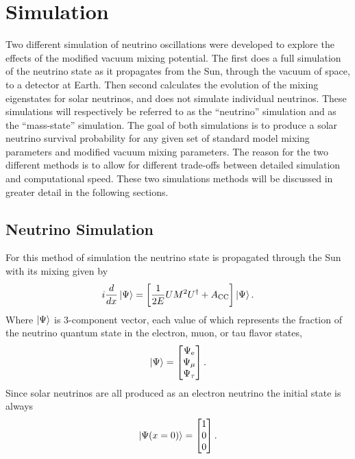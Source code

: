 \section{Simulation}
Two different simulation of neutrino oscillations were developed to explore the
effects of the modified vacuum mixing potential.
The first
does a full simulation of the neutrino state as it propagates from the
Sun, through the vacuum of space, to a detector at Earth.
Then second calculates the evolution
of the mixing eigenstates for solar neutrinos, and does not simulate individual
neutrinos.
These simulations will respectively be referred to as the ``neutrino'' simulation
and as the ``mass-state'' simulation.
The goal of both simulations is to produce a solar neutrino survival probability
for any given set of standard model mixing parameters and modified vacuum
mixing parameters.
The reason for the two different methods is to allow for different
trade-offs between detailed simulation and computational speed.
These two simulations methods will be discussed in greater detail in the following sections.

\subsection{Neutrino Simulation}
For this method of simulation the neutrino state is propagated through the
Sun with its mixing given by
\begin{equation}
    i\frac{d}{dx}\ket{\Psi} = \left[\frac{1}{2E}UM^{2}U^{\dagger} + A_{\mathrm{CC}}\right]\ket{\Psi}\text{.}
    \label{eqn:mixing_schrodinger}
\end{equation}
Where $\ket{\Psi}$ is 3-component vector, each value of which represents
the fraction of the neutrino quantum state in the electron, muon, or tau flavor states,
\begin{equation}
\ket{\Psi} = 
\begin{bmatrix}
    \Psi_{\mathrm{e}}\\
    \Psi_{\mathrm{\mu}}\\
    \Psi_{\mathrm{\tau}}\\
\end{bmatrix}\mathrm{.}
\end{equation}
Since solar neutrinos are all produced as an electron neutrino the
initial state is always
\begin{equation}
\ket{\Psi(x=0)} = 
\begin{bmatrix}
1\\
0\\
0\\
\end{bmatrix}\mathrm{.}
\end{equation}

